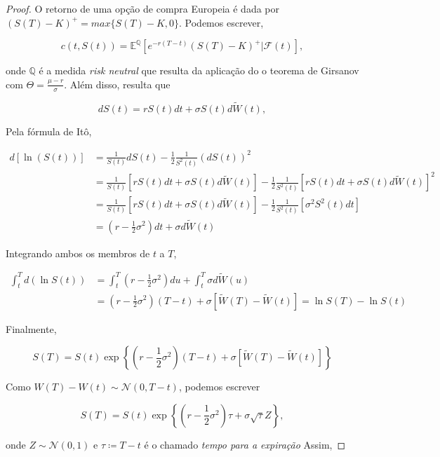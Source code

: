 \documentclass{article}
\begin{document}
\begin{proof}
    O retorno de uma opção de compra Europeia é dada por $(S(T)-K)^+=max\{S(T)-K,0\}$. Podemos escrever,

    \vspace{0.5cm}

    $$c(t,S(t))=\mathbb{E^Q}[e^{-r(T-t)}(S(T)-K)^+|\mathcal{F}(t)],$$

    onde $\mathbb{Q}$ é a medida \textit{risk neutral } que resulta da aplicação do o teorema de Girsanov com $\Theta=\frac{\mu-r}{\sigma}$. Além disso, resulta que 
    
    $$dS(t)=rS(t)dt+\sigma S(t)d \tilde{W}(t),$$

    Pela fórmula de Itô,

    \begin{align*}
        d[\ln(S(t))]&=\frac{1}{S(t)}dS(t)-\frac{1}{2}\frac{1}{S^2(t)}(dS(t))^2\\
                    &=\frac{1}{S(t)}[rS(t)dt+\sigma S(t)d \tilde{W}(t)]-\frac{1}{2}\frac{1}{S^2(t)}[rS(t)dt+\sigma S(t)d \tilde{W}(t)]^2\\
                    &=\frac{1}{S(t)}[rS(t)dt+\sigma S(t)d \tilde{W}(t)]-\frac{1}{2}\frac{1}{S^2(t)}[\sigma^2S^2(t)dt]\\
                    &=\left(r-\frac{1}{2} \sigma^2 \right)dt+ \sigma d \tilde{W}(t)
    \end{align*}

    Integrando ambos os membros de $t $ a $T$,

    \begin{align*}
        \int_t^T d(\ln S(t)) &= \int_t^T \left( r-\frac{1}{2} \sigma^2 \right) du +\int_t^T \sigma d\tilde{W}(u)\\
                             &=\left(r-\frac{1}{2}\sigma^2\right)(T-t)+\sigma[\tilde{W}(T)-\tilde{W}(t)] =\ln S(T)- \ln S(t)
    \end{align*}

    Finalmente, 

    $$S(T)= S(t)\exp \left\{ \left(r-\frac{1}{2}\sigma^2\right)(T-t)+\sigma[\tilde{W}(T)-\tilde{W}(t)] \right\}$$

    Como $W(T)-W(t) \sim \mathcal{N}(0, T-t)$, podemos escrever

    $$S(T)= S(t)\exp \left\{ \left(r-\frac{1}{2}\sigma^2\right)\tau+\sigma\sqrt{\tau} Z \right\},$$

    onde $Z \sim \mathcal{N}(0,1)$ e $\tau \coloneq T-t$ é o chamado \textit{tempo para a expiração}
Assim,


\end{proof}
\end{document}
